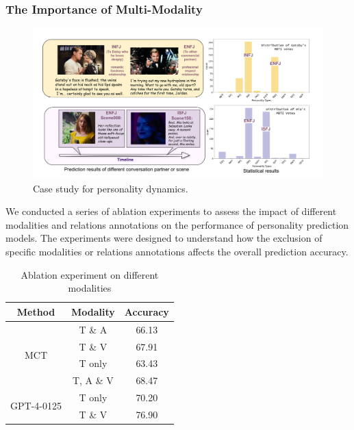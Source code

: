 \subsubsection{The Importance of Multi-Modality}
\begin{figure}[ht]
    \centering
    \includegraphics[width=\textwidth, trim= 0 10 0 0, clip]{images/Dynamics.pdf}
    \caption{Case study for personality dynamics.}
    \label{fig:dynamics}
\end{figure}


We conducted a series of ablation experiments to assess the impact of different modalities and relations annotations on the performance of personality prediction models. The experiments were designed to understand how the exclusion of specific modalities or relations annotations affects the overall prediction accuracy.

\begin{table}[ht]
    \small
    \centering
    \begin{tabular}{c|c|c}
        \hline
        \textbf{Method} & \textbf{Modality} & \textbf{Accuracy}\\
        \hline
        \multirow{4}{*}{MCT} & T \& A & 66.13  \\
        & T \& V & 67.91 \\
        & T only & 63.43 \\
        & T, A \& V & 68.47 \\  
        \hline
        \multirow{2}{*}{GPT-4-0125} & T only & 70.20 \\     
        & T \& V & 76.90 \\
        \hline
    \end{tabular}
    \caption{Ablation experiment on different modalities} 
\label{table:Ablation_modal}
\end{table}


